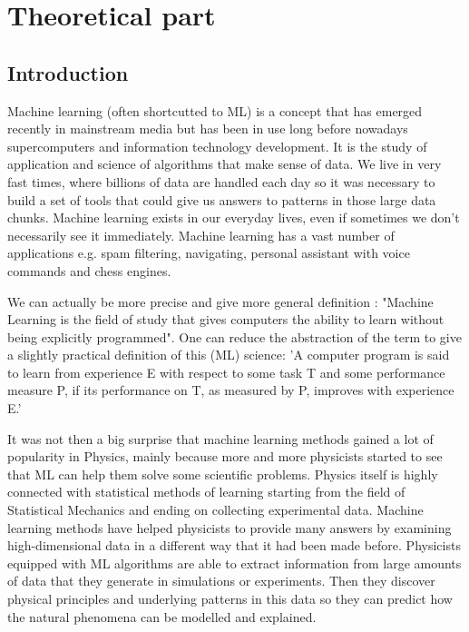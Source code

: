 \documentclass[a4paper,oneside,openright,11pt]{book}
\begin{document}
\part{Theoretical part}

\chapter{Introduction}

Machine learning (often shortcutted to ML) is a concept that has emerged recently in mainstream media but has been in use long before nowadays supercomputers and information technology development. It is the study of application and science of algorithms that make sense of data. We live in very fast times, where billions of data are handled each day so it was necessary to build a set of tools that could give us answers to patterns in those large data chunks. Machine learning exists in our everyday lives, even if sometimes we don't necessarily see it immediately. Machine learning has a vast number of applications e.g. spam filtering, navigating, personal assistant with voice commands and chess engines.

We can actually be more precise and give more general definition \cite{aurelion}: "Machine Learning is the field of study that gives computers the ability to learn without being explicitly programmed". One can reduce the abstraction of the term to give a slightly practical definition of this (ML) science: 'A computer program is said to learn from experience E with respect to some task T and some performance measure P, if its performance on T, as measured by P, improves with experience E.'\cite{aurelion}

It was not then a big surprise that machine learning methods gained a lot of popularity in Physics, mainly because more and more physicists started to see that ML can help them solve some scientific problems. Physics itself is highly connected with statistical methods of learning starting from the field of Statistical Mechanics and ending on collecting experimental data. Machine learning methods have helped physicists to provide many answers by examining high-dimensional data in a different way that it had been made before. Physicists equipped with ML algorithms are able to extract information from large amounts of data  that they generate in simulations or experiments. Then they discover physical principles and underlying patterns in this data so they can predict how the natural phenomena can be modelled and explained. \cite{ucla}
\end{document}
